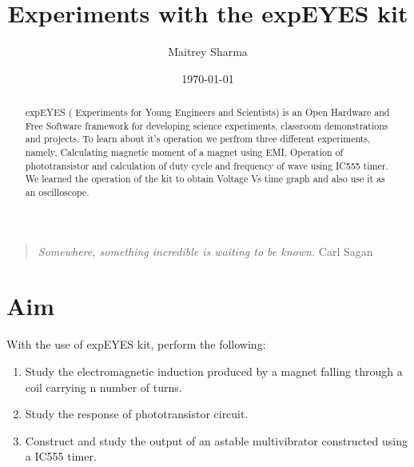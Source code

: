 \documentclass[%
 aip,
 amsmath,amssymb,
 reprint, floatfix%
]{revtex4-1}
\begin{document}

\title[Experiments with the expEYES kit]{Experiments with the expEYES kit}
\author{Maitrey Sharma}

\date{\today}%

\begin{abstract}
expEYES ( Experiments for Young Engineers and Scientists) is an
Open Hardware and Free Software framework for developing science experiments, classroom demonstrations and projects. To learn about it’s operation we perfrom three different experiments, namely, Calculating magnetic moment of a magnet using EMI, Operation of phototransistor and
calculation of duty cycle and frequency of wave using IC555 timer. We
learned the operation of the kit to obtain Voltage Vs time graph and also
use it as an oscilloscope.
\end{abstract}

\maketitle 


\begin{quotation}
\textit{Somewhere, something incredible is waiting to be known.}
\newline
\hspace*{0pt}\hfill Carl Sagan
\end{quotation}

\section{Aim}
    With the use of expEYES kit, perform the following:
    \begin{enumerate}
        \item Study the electromagnetic induction produced by a magnet falling through a coil carrying n number of turns.
        \item Study the response of phototransistor circuit.
        \item Construct and study the output of an astable multivibrator constructed using a IC555 timer. 
    \end{enumerate}
\end{document}
